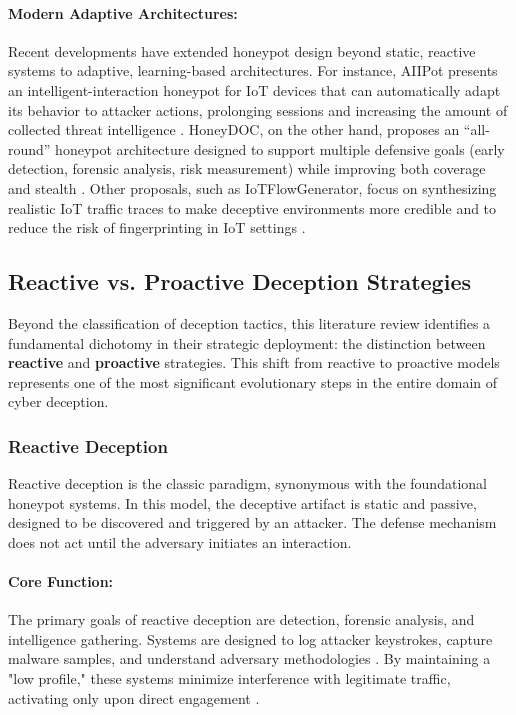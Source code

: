 \paragraph{Modern Adaptive Architectures:}
Recent developments have extended honeypot design beyond static, reactive systems
to adaptive, learning-based architectures.
For instance, AIIPot presents an intelligent-interaction honeypot for IoT devices
that can automatically adapt its behavior to attacker actions, prolonging sessions
and increasing the amount of collected threat intelligence \cite{aiipot2023}.
HoneyDOC, on the other hand, proposes an ``all-round'' honeypot architecture
designed to support multiple defensive goals (early detection, forensic analysis,
risk measurement) while improving both coverage and stealth \cite{honeydoc2019}.
Other proposals, such as IoTFlowGenerator, focus on synthesizing realistic IoT
traffic traces to make deceptive environments more credible and to reduce the
risk of fingerprinting in IoT settings \cite{iotflowgenerator2023}.
\subsection{Reactive vs. Proactive Deception Strategies}

Beyond the classification of deception tactics, this literature review identifies a fundamental dichotomy in
their strategic deployment: the distinction between \textbf{reactive} and \textbf{proactive} strategies.
This shift from reactive to proactive models represents one of the most significant evolutionary steps in the
entire domain of cyber deception.

\subsubsection{Reactive Deception}

Reactive deception is the classic paradigm, synonymous with the foundational honeypot systems. In this model, the
deceptive artifact is static and passive, designed to be discovered and triggered by an attacker. The defense
mechanism does not act until the adversary initiates an interaction.

\paragraph{Core Function:} The primary goals of reactive deception are detection, forensic analysis, and
intelligence gathering. Systems are designed to log attacker keystrokes, capture malware samples, and
understand adversary methodologies \cite{nawrocki2016survey}. By maintaining a "low profile," these
systems minimize interference with legitimate traffic, activating only upon direct engagement \cite{provos2004virtual}.

